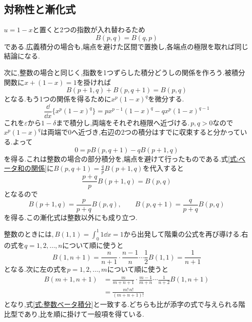\subsection{対称性と漸化式}

$u=1-x$と置くと2つの指数が入れ替わるため
\begin{equation}\label{式:ベータ対称性}
 B(p,q)=B(q,p)
\end{equation}
である.広義積分の場合も,端点を避けた区間で置換し,各端点の極限を取れば同じ結論になる.

次に,整数の場合と同じく,指数を1つずらした積分どうしの関係を作ろう.被積分関数に$x+(1-x)=1$を掛ければ
\begin{equation}\label{式:ベータ和の関係}
 B(p+1,q)+B(p,q+1)=B(p,q)
\end{equation}
となる.もう1つの関係を得るために$x^p(1-x)^q$を微分する.
\[
 \frac{\dd}{\dd x}\{x^p(1-x)^q\}
 =p x^{p-1}(1-x)^q-qx^p(1-x)^{q-1}
\]
これを$\varepsilon$から$1-\delta$まで積分し,両端をそれぞれ極限へ近づける.\,$p,q>0$なので$x^p(1-x)^q$は両端で$0$へ近づき,右辺の2つの積分はすでに収束すると分かっている.よって
\[
 0=pB(p,q+1)-qB(p+1,q)
\]
を得る.これは整数の場合の部分積分を,端点を避けて行ったものである.式\eqref{式:ベータ和の関係}に$B(p,q+1)=\frac qpB(p+1,q)$を代入すると
\[
 \frac{p+q}{p}B(p+1,q)=B(p,q)
\]
となるので
\begin{equation}\label{式:ベータ漸化式}
 B(p+1,q)=\frac{p}{p+q}B(p,q),\qquad
 B(p,q+1)=\frac{q}{p+q}B(p,q)
\end{equation}
を得る.この漸化式は整数以外にも成り立つ.

整数のときには,\,$B(1,1)=\int_0^1 1\dd x=1$から出発して階乗の公式を再び導ける.右の式を$q=1,2,\ldots,n$について順に使うと
\[
 B(1,n+1)=\frac{n}{n+1}\cdot\frac{n-1}{n}\cdots\frac12B(1,1)=\frac{1}{n+1}
\]
となる.次に左の式を$p=1,2,\ldots,m$について順に使うと
\begin{align*}
 B(m+1,n+1)
 &=\frac{m}{m+n+1}\cdot\frac{m-1}{m+n}\cdots\frac{1}{n+2}B(1,n+1)\\
 &=\frac{m!\,n!}{(m+n+1)!}
\end{align*}
となり,式\eqref{式:整数ベータ積分}と一致する.どちらも比が添字の式で与えられる階比型であり,比を順に掛けて一般項を得ている.

